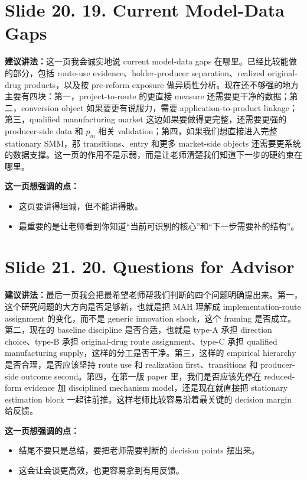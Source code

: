 \documentclass[12pt]{ctexart}
\begin{document}
\newpage
\section*{Slide 20. 19. Current Model-Data Gaps}
\textbf{建议讲法：}这一页我会诚实地说 current model-data gaps 在哪里。已经比较能做的部分，包括 route-use evidence、holder-producer separation、realized original-drug products，以及按 pre-reform exposure 做异质性分析。现在还不够强的地方主要有四块：第一，project-to-route 的更直接 measure 还需要更干净的数据；第二，conversion object 如果要更有说服力，需要 application-to-product linkage；第三，qualified manufacturing market 这边如果要做得更完整，还需要更强的 producer-side data 和 $p_m$ 相关 validation；第四，如果我们想直接进入完整 stationary SMM，那 transitions、entry 和更多 market-side objects 还需要更系统的数据支撑。这一页的作用不是示弱，而是让老师清楚我们知道下一步的硬约束在哪里。

\vspace{0.5em}
\textbf{这一页想强调的点：}
\begin{itemize}
\item 这页要讲得坦诚，但不能讲得散。
\item 最重要的是让老师看到你知道“当前可识别的核心”和“下一步需要补的结构”。
\end{itemize}

\newpage
\section*{Slide 21. 20. Questions for Advisor}
\textbf{建议讲法：}最后一页我会把最希望老师帮我们判断的四个问题明确提出来。第一，这个研究问题的大方向是否足够新，也就是把 MAH 理解成 implementation-route assignment 的变化，而不是 generic innovation shock，这个 framing 是否成立。第二，现在的 baseline discipline 是否合适，也就是 type-A 承担 direction choice、type-B 承担 original-drug route assignment、type-C 承担 qualified manufacturing supply，这样的分工是否干净。第三，这样的 empirical hierarchy 是否合理，是否应该坚持 route use 和 realization first、transitions 和 producer-side outcome second。第四，在第一版 paper 里，我们是否应该先停在 reduced-form evidence 加 disciplined mechanism model，还是现在就直接把 stationary estimation block 一起往前推。这样老师比较容易沿着最关键的 decision margin 给反馈。

\vspace{0.5em}
\textbf{这一页想强调的点：}
\begin{itemize}
\item 结尾不要只是总结，要把老师需要判断的 decision points 摆出来。
\item 这会让会谈更高效，也更容易拿到有用反馈。
\end{itemize}
\end{document}
